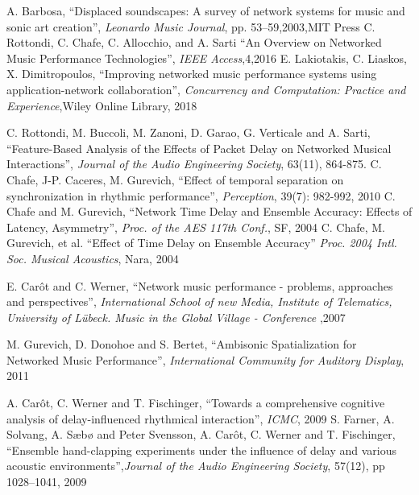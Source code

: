 A. Barbosa, ``Displaced soundscapes: A survey of network systems for music and sonic art creation'',
\emph{Leonardo Music Journal},
pp. 53--59,2003,MIT Press
%
C. Rottondi, C. Chafe, C. Allocchio, and A. Sarti
``An Overview on Networked Music Performance Technologies'', \emph{IEEE Access},4,2016
%
E. Lakiotakis, C. Liaskos, X. Dimitropoulos, ``Improving networked music performance systems using application-network collaboration'', \emph{Concurrency and Computation: Practice and Experience},Wiley Online Library, 2018

C. Rottondi, M. Buccoli, M. Zanoni, D. Garao,  G. Verticale and A. Sarti, ``Feature-Based Analysis of the Effects of Packet Delay on Networked Musical Interactions'', \emph{Journal of the Audio Engineering Society}, 63(11), 864-875.
C. Chafe, J-P. Caceres, M. Gurevich, ``Effect of temporal separation on synchronization in rhythmic performance'',
\emph{Perception}, 39(7): 982-992, 2010
%
C. Chafe and M. Gurevich, ``Network Time Delay and Ensemble Accuracy: Effects of Latency, Asymmetry'', \emph{Proc. of the AES 117th Conf.}, SF, 2004
%
C. Chafe, M. Gurevich, et al. ``Effect of Time Delay on Ensemble Accuracy''
\emph{Proc. 2004 Intl. Soc. Musical Acoustics}, Nara, 2004

E. Car\^ot and C. Werner, ``Network music performance - problems, approaches and perspectives'',
\emph{International School of new Media, Institute of Telematics, University of Lübeck. Music in the Global Village - Conference} ,2007
%

M. Gurevich, D. Donohoe and S. Bertet, ``Ambisonic Spatialization for Networked Music Performance'', \emph{International Community for Auditory Display}, 2011

A. Car{\^o}t, C. Werner and T. Fischinger, ``Towards a comprehensive cognitive analysis of delay-influenced rhythmical interaction'', \emph{ICMC}, 2009
%
S. Farner, A. Solvang, A. S{\ae}b{\o} and Peter Svensson, A. Car{\^o}t, C. Werner and T. Fischinger, ``Ensemble hand-clapping experiments under the influence of delay and various acoustic
environments'',\emph{Journal of the Audio Engineering Society}, 57(12), pp 1028--1041, 2009


